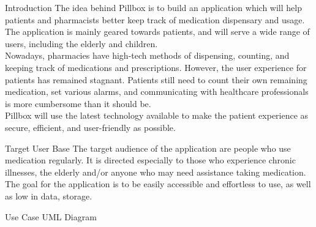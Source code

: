 \documentclass[22pt]{beamer}
\begin{document}
\begin{frame}[fragile]
\begin{textblock}{7.25}
\begin{block}{Introduction}
The idea behind Pillbox is to build an application which will help patients and pharmacists better keep track of medication dispensary and usage. The application is mainly geared towards patients, and will serve a wide range of users, including the elderly and children. \\
Nowadays, pharmacies have high-tech methods of dispensing, counting, and keeping track of medications and prescriptions. However, the user experience for patients has remained stagnant. Patients still need to count their own remaining medication, set various alarms, and communicating with healthcare professionals is more cumbersome than it should be.\\
Pillbox will use the latest technology available to make the patient experience as secure, efficient, and user-friendly as possible.
\end{block}

\begin{block}{Target User Base}
The target audience of the application are people who use medication regularly. It is directed especially to those who experience chronic illnesses, the elderly and/or anyone who may need assistance taking medication. The goal for the application is to be easily accessible and effortless to use, as well as low in data, storage. 
\end{block}

\begin{block}{Use Case UML Diagram}


\end{block}
\end{textblock}
\end{frame}
\end{document}
